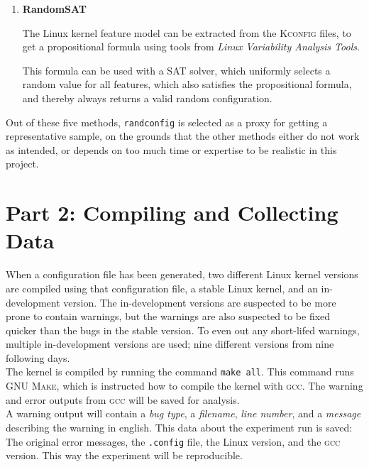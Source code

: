 \documentclass[a4paper,11pt]{report}
\newcommand{\textcode}[1]{\fboxsep=1pt\texttt{\colorbox{gray!20}{#1}}}
\begin{document}
\begin{enumerate}
    \item \textbf{RandomSAT}

The Linux kernel feature model can be extracted from the \textsc{Kconfig} 
files, to get a propositional formula using tools from \emph{Linux Variability Analysis Tools}\cite{lvat}. 

This formula can be used with a SAT solver, which uniformly selects a random
value for all features, which also satisfies the propositional formula, and
thereby always returns a valid random configuration.


    
\end{enumerate}


Out of these five methods, \texttt{randconfig} is selected as a proxy for 
getting a representative sample, on the grounds that the other methods either
do not work as intended, or depends on too much time or expertise to be realistic 
in this project.

            \section{Part 2: Compiling and Collecting Data}

When a configuration file has been generated, two different Linux kernel 
versions are compiled using that configuration file, a stable Linux kernel, and 
an in-development version. The in-development versions are suspected to be more 
prone to contain warnings, but the warnings are also suspected to be fixed 
quicker than the bugs in the stable version. To even out any short-lifed 
warnings, multiple in-development versions are used; nine different versions 
from nine following days.
\\

The kernel is compiled by running the command \textcode{make all}. This command 
runs \textsc{GNU Make}, which is instructed how to compile the kernel with 
\textsc{gcc}. The warning and error outputs from \textsc{gcc} will be saved for analysis.
\\

A warning output will contain a \emph{bug type}, a \emph{filename}, \emph{line 
number}, and a \emph{message} describing the warning in english. This data about the
experiment run is saved: The original error messages, the \texttt{.config} file, 
the Linux version, and the \textsc{gcc} version.
This way the experiment will be reproducible.
\end{document}
